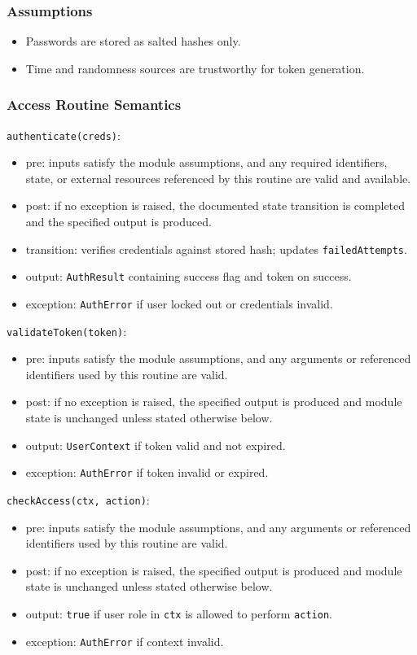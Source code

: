 \documentclass[12pt, titlepage]{article}
\begin{document}
\subsubsection{Assumptions}
\begin{itemize}
    \item Passwords are stored as salted hashes only.
    \item Time and randomness sources are trustworthy for token generation.
\end{itemize}

\subsubsection{Access Routine Semantics}

\noindent \texttt{authenticate(creds)}:
\begin{itemize}
    \item pre: inputs satisfy the module assumptions, and any required identifiers, state, or external resources referenced by this routine are valid and available.
    \item post: if no exception is raised, the documented state transition is completed and the specified output is produced.
    \item transition: verifies credentials against stored hash; updates \texttt{failedAttempts}.
    \item output: \texttt{AuthResult} containing success flag and token on success.
    \item exception: \texttt{AuthError} if user locked out or credentials invalid.
\end{itemize}

\noindent \texttt{validateToken(token)}:
\begin{itemize}
    \item pre: inputs satisfy the module assumptions, and any arguments or referenced identifiers used by this routine are valid.
    \item post: if no exception is raised, the specified output is produced and module state is unchanged unless stated otherwise below.
    \item output: \texttt{UserContext} if token valid and not expired.
    \item exception: \texttt{AuthError} if token invalid or expired.
\end{itemize}

\noindent \texttt{checkAccess(ctx, action)}:
\begin{itemize}
    \item pre: inputs satisfy the module assumptions, and any arguments or referenced identifiers used by this routine are valid.
    \item post: if no exception is raised, the specified output is produced and module state is unchanged unless stated otherwise below.
    \item output: \texttt{true} if user role in \texttt{ctx} is allowed to perform \texttt{action}.
    \item exception: \texttt{AuthError} if context invalid.
\end{itemize}
\end{document}
